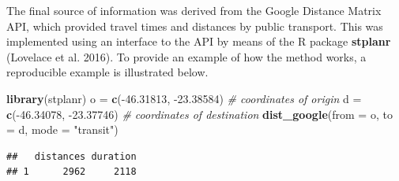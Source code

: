 \documentclass[]{article}
\newenvironment{Shaded}{\begin{snugshade}}{\end{snugshade}}
\newcommand{\KeywordTok}[1]{\textcolor[rgb]{0.13,0.29,0.53}{\textbf{{#1}}}}
\newcommand{\DataTypeTok}[1]{\textcolor[rgb]{0.13,0.29,0.53}{{#1}}}
\newcommand{\FloatTok}[1]{\textcolor[rgb]{0.00,0.00,0.81}{{#1}}}
\newcommand{\StringTok}[1]{\textcolor[rgb]{0.31,0.60,0.02}{{#1}}}
\newcommand{\CommentTok}[1]{\textcolor[rgb]{0.56,0.35,0.01}{\textit{{#1}}}}
\newcommand{\NormalTok}[1]{{#1}}
\begin{document}
The final source of information was derived from the Google Distance
Matrix API, which provided travel times and distances by public
transport. This was implemented using an interface to the API by means
of the R package \textbf{stplanr} (Lovelace et al. 2016). To provide an
example of how the method works, a reproducible example is illustrated
below.

\begin{Shaded}
\begin{Highlighting}[]
\KeywordTok{library}\NormalTok{(stplanr)}
\NormalTok{o =}\StringTok{ }\KeywordTok{c}\NormalTok{(-}\FloatTok{46.31813}\NormalTok{, -}\FloatTok{23.38584}\NormalTok{) }\CommentTok{# coordinates of origin}
\NormalTok{d =}\StringTok{ }\KeywordTok{c}\NormalTok{(-}\FloatTok{46.34078}\NormalTok{, -}\FloatTok{23.37746}\NormalTok{) }\CommentTok{# coordinates of destination}
\KeywordTok{dist_google}\NormalTok{(}\DataTypeTok{from =} \NormalTok{o, }\DataTypeTok{to =} \NormalTok{d, }\DataTypeTok{mode =} \StringTok{"transit"}\NormalTok{)}
\end{Highlighting}
\end{Shaded}

\begin{verbatim}
##   distances duration
## 1      2962     2118
\end{verbatim}
\end{document}
